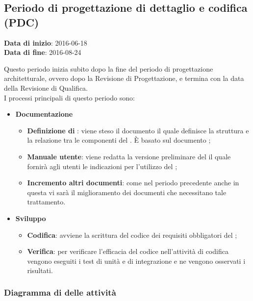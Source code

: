 		
		
	\subsection{Periodo di progettazione di dettaglio e codifica (PDC)}
	\begin{center}
		\textbf{Data di inizio}: 2016-06-18 \\
		\textbf{Data di fine}: 2016-08-24 \\
	\end{center}
	Questo periodo inizia subito dopo la fine del periodo di progettazione architetturale, ovvero dopo la Revisione di Progettazione, e termina con la data della Revisione di Qualifica. \\
	I processi principali di questo periodo sono: 
		\begin{itemize}
			\item \textbf{Documentazione} 
			\att
			\begin{itemize} 
				\item \textbf{Definizione di }: viene steso il documento \DPdocRQ{} il quale definisce la struttura e la relazione tra le componenti del . È basato sul documento \STdocRQ;
				\item \textbf{Manuale utente}: viene redatta la versione preliminare del \MUdocRQ{} il quale fornirà agli utenti le indicazioni per l'utilizzo del ;
				\item \textbf{Incremento altri documenti}: come nel periodo precedente anche in questa vi sarà il miglioramento dei documenti che necessitano tale trattamento.
			\end{itemize}
			\item \textbf{Sviluppo}
			\att
			\begin{itemize}
				\item \textbf{Codifica}: avviene la scrittura del codice dei requisiti obbligatori del ;
				\item \textbf{Verifica}: per verificare l'efficacia del codice  nell'attività di codifica vengono eseguiti i test di unità e di integrazione e ne vengono osservati i risultati. 
			\end{itemize}
		\end{itemize}
		\subsubsection{Diagramma di  delle attività}
		

